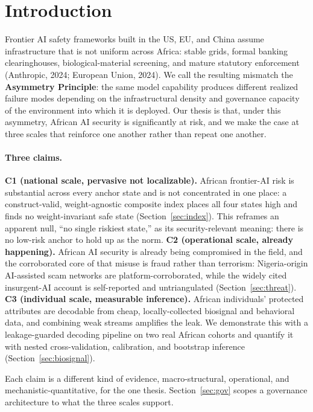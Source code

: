 \documentclass{article}
\begin{document}
\section{Introduction}
Frontier AI safety frameworks built in the US, EU, and China assume infrastructure that is not uniform across
Africa: stable grids, formal banking clearinghouses, biological-material screening, and mature statutory
enforcement (Anthropic, 2024; European Union, 2024). We call the resulting mismatch the \textbf{Asymmetry
Principle}: the same model capability produces different realized failure modes depending on the infrastructural
density and governance capacity of the environment into which it is deployed. Our thesis is that, under this
asymmetry, African AI security is significantly at risk, and we make the case at three scales that reinforce one
another rather than repeat one another.

\paragraph{Three claims.}
\textbf{C1 (national scale, pervasive not localizable).} African frontier-AI risk is substantial across every
anchor state and is not concentrated in one place: a construct-valid, weight-agnostic composite index places all
four states high and finds no weight-invariant safe state (Section~\ref{sec:index}). This reframes an apparent
null, ``no single riskiest state,'' as its security-relevant meaning: there is no low-risk anchor to hold up as
the norm.
\textbf{C2 (operational scale, already happening).} African AI security is already being compromised in the
field, and the corroborated core of that misuse is fraud rather than terrorism: Nigeria-origin AI-assisted scam
networks are platform-corroborated, while the widely cited insurgent-AI account is self-reported and
untriangulated (Section~\ref{sec:threat}).
\textbf{C3 (individual scale, measurable inference).} African individuals' protected attributes are decodable
from cheap, locally-collected biosignal and behavioral data, and combining weak streams amplifies the leak. We
demonstrate this with a leakage-guarded decoding pipeline on two real African cohorts and quantify it with
nested cross-validation, calibration, and bootstrap inference (Section~\ref{sec:biosignal}).

Each claim is a different kind of evidence, macro-structural, operational, and mechanistic-quantitative, for the
one thesis. Section~\ref{sec:gov} scopes a governance architecture to what the three scales support.
\end{document}
